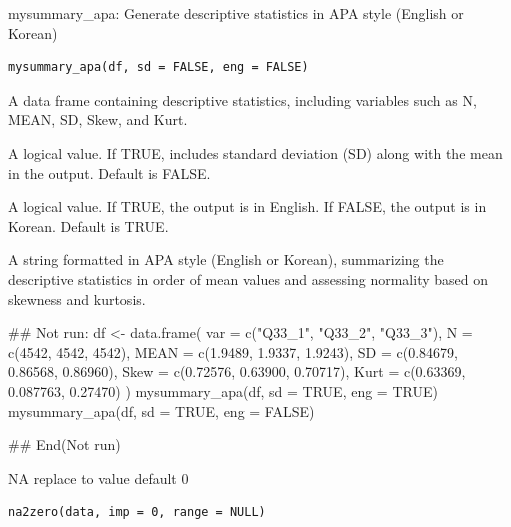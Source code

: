 \documentclass[a4paper]{book}
\begin{document}
%
\begin{Description}
mysummary\_apa: Generate descriptive statistics in APA style (English or Korean)
\end{Description}
%
\begin{Usage}
\begin{verbatim}
mysummary_apa(df, sd = FALSE, eng = FALSE)
\end{verbatim}
\end{Usage}
%
\begin{Arguments}
\begin{ldescription}
\item[\code{df}] A data frame containing descriptive statistics, including variables such as N, MEAN, SD, Skew, and Kurt.

\item[\code{sd}] A logical value. If TRUE, includes standard deviation (SD) along with the mean in the output. Default is FALSE.

\item[\code{eng}] A logical value. If TRUE, the output is in English. If FALSE, the output is in Korean. Default is TRUE.
\end{ldescription}
\end{Arguments}
%
\begin{Value}
A string formatted in APA style (English or Korean), summarizing the descriptive statistics in order of mean values and assessing normality based on skewness and kurtosis.
\end{Value}
%
\begin{Examples}
\begin{ExampleCode}
## Not run: 
df <- data.frame(
  var = c("Q33_1", "Q33_2", "Q33_3"),
  N = c(4542, 4542, 4542),
  MEAN = c(1.9489, 1.9337, 1.9243),
  SD = c(0.84679, 0.86568, 0.86960),
  Skew = c(0.72576, 0.63900, 0.70717),
  Kurt = c(0.63369, 0.087763, 0.27470)
)
mysummary_apa(df, sd = TRUE, eng = TRUE)
mysummary_apa(df, sd = TRUE, eng = FALSE)

## End(Not run)
\end{ExampleCode}
\end{Examples}
%
\begin{Description}
NA replace to value default 0
\end{Description}
%
\begin{Usage}
\begin{verbatim}
na2zero(data, imp = 0, range = NULL)
\end{verbatim}
\end{Usage}
\end{document}
